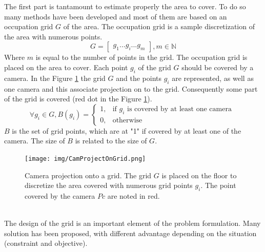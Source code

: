 
The first part is tantamount to estimate properly the area to cover. To do so many methods have been developed and most of them are based on an occupation grid $G$ of the area. The occupation grid is a sample discretization of the area with numerous points.
\begin{equation}\label{eq:Grid}
	G=\begin{bmatrix}
	 	g_1 ...g_i ... g_m
	\end{bmatrix}  , m\in \mathbb{N}
\end{equation}
Where $m$ is equal to the number of points in the grid.
The occupation grid is placed on the area to cover. Each point $g_i$ of the grid $G$ should be covered by a camera. In the Figure \ref{fig:cam_projOnGrid} the grid $G$ and the points $g_i$ are represented, as well as one camera and this associate projection on to the grid.
 Consequently some part of the grid is covered (red dot in the Figure \ref{fig:cam_projOnGrid}). 
\begin{equation}\label{eq:B}
\forall g_i \in G, B(g_i)= \begin{cases} 1, & \mbox{if } g_i \mbox{ is covered by at least one camera }\\ 0, & \mbox{otherwise}   \end{cases}
\end{equation}
$B$ is the set of grid points, which are at "1"  if covered by at least one of the camera. The size of $B$ is related to the size of $G$.
\begin{figure}[t!]
		\centering
  		\texttt{[image: img/CamProjectOnGrid.png]}
  
 	 	\endminipage\hfill\caption{Camera projection onto a grid. The grid $G$ is placed on the floor to discretize the area covered with numerous grid points $g_i$. The point covered by the camera $Pc$ are noted in red.}\label{fig:cam_projOnGrid}
\end{figure}
\\ The design of the grid is an important element of the problem formulation. Many solution has been proposed, with different advantage depending on the situation (constraint and objective).\\

